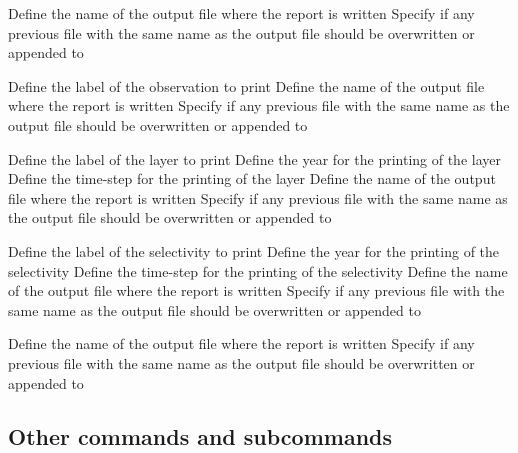  {Define the name of the output file where the report is written}
 {Specify if any previous file with the same name as the output file should be overwritten or appended to}
\par\textbf{}\par
{} {Define the label of the observation to print}
 {Define the name of the output file where the report is written}
 {Specify if any previous file with the same name as the output file should be overwritten or appended to}
\par\textbf{}\par
{} {Define the label of the layer to print}
 {Define the year for the printing of the layer}
 {Define the time-step for the printing of the layer}
 {Define the name of the output file where the report is written}
 {Specify if any previous file with the same name as the output file should be overwritten or appended to}
\par\textbf{}\par
{} {Define the label of the selectivity to print}
 {Define the year for the printing of the selectivity}
 {Define the time-step for the printing of the selectivity}
 {Define the name of the output file where the report is written}
 {Specify if any previous file with the same name as the output file should be overwritten or appended to}
\par\textbf{}\par
{} {Define the name of the output file where the report is written}
 {Specify if any previous file with the same name as the output file should be overwritten or appended to}
\subsection{Other commands and subcommands}\par
{}\par\par
